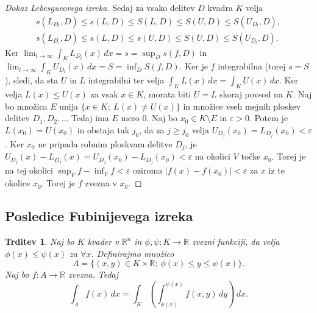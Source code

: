 \documentclass[10pt, a4paper]{article}
\newtheorem{trditev}[izr]{Trditev}
\newenvironment{noticeC}{%
  \tcolorbox[%
  notitle,
  empty,
  enhanced,  %
  breakable,
  coltext=black, 
  fontupper=\rmfamily,
  parbox=false,
  noparskip,
  sharp corners,
  boxrule=-1pt,  %
  frame hidden,
  left=7pt,  %
  right=7pt,
  top=5pt,
  bottom=5pt,
  before skip=2.5ex plus 2pt,
  after skip=2.5ex plus 2pt,
  overlay unbroken and last={%
  },
  ]}
{\endtcolorbox}
\newenvironment{dokaz}%
  {\begin{noticeC}\begin{proof}}%
  {\end{proof}\end{noticeC}}
\newcommand{\R}{\mathbb {R}}
\begin{document}
\begin{dokaz}[Dokaz Lebesgueovega izreka]
    Sedaj za vsako delitev $D$ kvadra $K$ velja 
    \begin{gather*}
        s(L_{D_l}, D) \leq s(L, D) \leq S(L, D) \leq S(U, D) \leq S(U_{D_l}, D),\\
        s(L_{D_l}, D) \leq s(L, D) \leq s(U, D) \leq S(U, D) \leq S(U_{D_l}, D).
    \end{gather*}
    Ker $\lim_{l \to \infty} \int_K L_{D_l} (x)\, dx = s = \sup_D s (f, D)$ in 
    $\lim_{l \to \infty} \int_K U_{D_l} (x)\, dx = S = \inf_D S (f, D)$.
    Ker je $f$ integrabilna (torej $s = S$), sledi, da sta $U$ in $L$ integrabilni 
    ter velja $\int_K L(x)\, dx = \int_K U(x)\, dx$.
    Ker velja $L(x) \leq U(x)$ za vsak $x \in K$, morata biti $U = L$ skoraj povsod na $K$.
    Naj bo množica $E$ unija $\{x \in K;\ L(x) \neq U(x)\}$ in množice vseh mejnih ploskev delitev $D_1, D_2, \dots$
    Tedaj ima $E$ mero $0$. Naj bo $x_0\in K \setminus E$ in $\varepsilon > 0$.
    Potem je $L(x_0) = U(x_0)$ in obstaja tak $j_0$, da za $j \geq j_0$ velja 
    $U_{D_j} (x_0) = L_{D_j} (x_0) < \varepsilon$.
    Ker $x_0$ ne pripada robnim ploskvam delitve $D_j$, je $U_{D_j} (x) - L_{D_j} (x) = U_{D_j} (x_0) - L_{D_j} (x_0) < \varepsilon$
    na okolici $V$ točke $x_0$. Torej je na tej okolici $\sup_V f - \inf_V f < \varepsilon$ oziroma 
    $|f(x) - f(x_0)| < \varepsilon$ za $x$ iz te okolice $x_0$.
    Torej je $f$ zvezna v $x_0$.
\end{dokaz}

\subsection{Posledice Fubinijevega izreka}

\begin{trditev}
    Naj bo $K$ kvader v $\R^n$ in $\phi, \psi: K \to \R$ zvezni funkciji, 
    da velja $\phi(x) \leq \psi(x)$ za $\forall x$.
    Definirajmo množico $$A = \{(x, y) \in K \times \R;\ \phi(x) \leq y \leq \psi(x)\}.$$
    Naj bo $f: A \to \R$ zvezna. Tedaj 
    $$\int_A f(x)\, dx = \int_K \left(\int_{\phi(x)} ^{\psi(x)} f(x, y)\, dy\right)\, dx.$$
\end{trditev}
\end{document}

